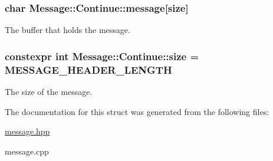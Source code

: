 \subsubsection[{\texorpdfstring{message}{message}}]{\setlength{\rightskip}{0pt plus 5cm}char Message\+::\+Continue\+::message\mbox{[}{\bf size}\mbox{]}}\hypertarget{struct_message_1_1_continue_a42a1bf71c1b2dbb2022979472a036367}{}\label{struct_message_1_1_continue_a42a1bf71c1b2dbb2022979472a036367}


The buffer that holds the message. 

\subsubsection[{\texorpdfstring{size}{size}}]{\setlength{\rightskip}{0pt plus 5cm}constexpr int Message\+::\+Continue\+::size = {\bf M\+E\+S\+S\+A\+G\+E\+\_\+\+H\+E\+A\+D\+E\+R\+\_\+\+L\+E\+N\+G\+TH}\hspace{0.3cm}{\ttfamily [static]}}\hypertarget{struct_message_1_1_continue_a11f9268149d7d619ae87aaf575365919}{}\label{struct_message_1_1_continue_a11f9268149d7d619ae87aaf575365919}


The size of the message. 



The documentation for this struct was generated from the following files\+:\begin{DoxyCompactItemize}
\item 
\hyperlink{message_8hpp}{message.\+hpp}\item 
message.\+cpp\end{DoxyCompactItemize}
